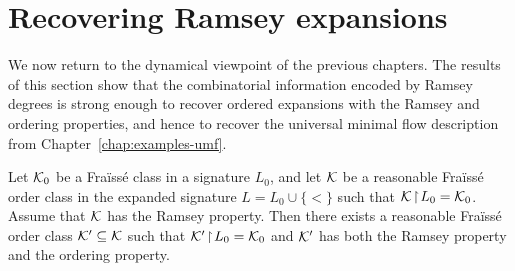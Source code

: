 \section{Recovering Ramsey expansions}

We now return to the dynamical viewpoint of the previous chapters. The results of this section show that the combinatorial information encoded by Ramsey degrees is strong enough to recover ordered expansions with the Ramsey and ordering properties, and hence to recover the universal minimal flow description from Chapter~\ref{chap:examples-umf}.

\begin{theorem}
    \label{thm:recover-ramsey-ordering-subexpansion}
    Let \(\mathcal{K}_0\) be a Fraïssé class in a signature \(L_0\), and let \(\mathcal{K}\) be a reasonable Fraïssé order class in the expanded signature \(L=L_0\cup\{<\}\) such that \(\mathcal{K}\!\restriction\!L_0=\mathcal{K}_0\). Assume that \(\mathcal{K}\) has the Ramsey property. Then there exists a reasonable Fraïssé order class \(\mathcal{K}'\subseteq\mathcal{K}\) such that \(\mathcal{K}'\!\restriction\!L_0=\mathcal{K}_0\) and \(\mathcal{K}'\) has both the Ramsey property and the ordering property.
\end{theorem}


